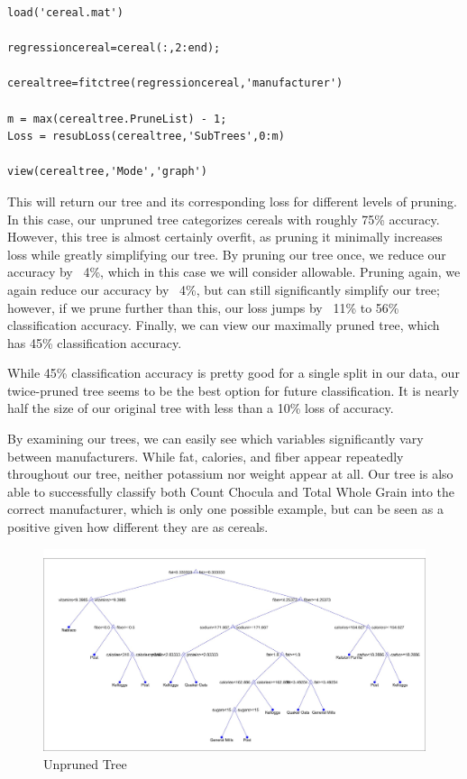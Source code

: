 \documentclass[12pt,english,letterpaper]{article}
\begin{document}
\begin{lstlisting}[style=Matlab-editor,frame=single]
load('cereal.mat')

regressioncereal=cereal(:,2:end);

cerealtree=fitctree(regressioncereal,'manufacturer')

m = max(cerealtree.PruneList) - 1;
Loss = resubLoss(cerealtree,'SubTrees',0:m)

view(cerealtree,'Mode','graph')
\end{lstlisting}


This will return our tree and its corresponding loss for different levels of pruning. In this case, our unpruned tree categorizes cereals with roughly 75\% accuracy. However, this tree is almost certainly overfit, as pruning it minimally increases loss while greatly simplifying our tree. By pruning our tree once, we reduce our accuracy by ~4\%, which in this case we will consider allowable. Pruning again, we again reduce our accuracy by ~4\%, but can still significantly simplify our tree; however, if we prune further than this, our loss jumps by ~11\% to 56\% classification accuracy. Finally, we can view our maximally pruned tree, which has 45\% classification accuracy.

While 45\% classification accuracy is pretty good for a single split in our data, our twice-pruned tree seems to be the best option for future classification. It is nearly half the size of our original tree with less than a 10\% loss of accuracy.

By examining our trees, we can easily see which variables significantly vary between manufacturers. While fat, calories, and fiber appear repeatedly throughout our tree, neither potassium nor weight appear at all. Our tree is also able to successfully classify both Count Chocula and Total Whole Grain into the correct manufacturer, which is only one possible example, but can be seen as a positive given how different they are as cereals.

\pagebreak
\begin{figure}[tbp!]
    \centering
    \includegraphics[width=\linewidth]{Cereal Tree Unpruned.jpg}
    \caption{Unpruned Tree}
    \label{fig:unpruned}
\end{figure}
\end{document}
